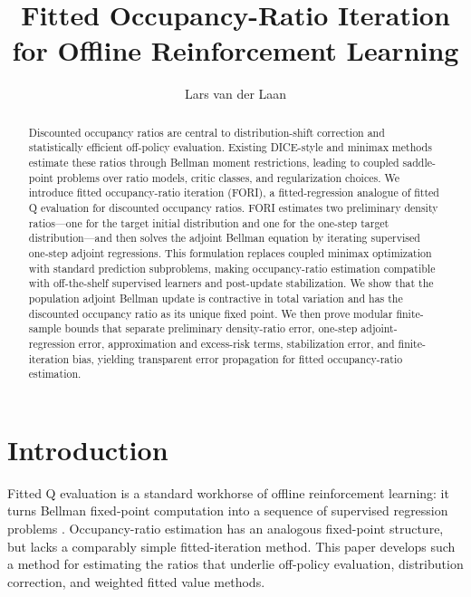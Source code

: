 \documentclass{article}
\title{Fitted Occupancy-Ratio Iteration for Offline Reinforcement Learning}
\author{Lars van der Laan}
\newcommand{\1}{\mathbf{1}}
\theoremstyle{plain}
\theoremstyle{definition}
\theoremstyle{remark}
\begin{document}
\maketitle
\begin{abstract}
Discounted occupancy ratios are central to distribution-shift correction and
statistically efficient off-policy evaluation. Existing DICE-style and minimax
methods estimate these ratios through Bellman moment restrictions, leading to
coupled saddle-point problems over ratio models, critic classes, and
regularization choices. We introduce fitted occupancy-ratio iteration
(\textsc{FORI}), a fitted-regression analogue of fitted Q evaluation for
discounted occupancy ratios. \textsc{FORI} estimates two preliminary density
ratios---one for the target initial distribution and one for the one-step target
distribution---and then solves the adjoint Bellman equation by iterating
supervised one-step adjoint regressions. This formulation replaces coupled
minimax optimization with standard prediction subproblems, making occupancy-ratio
estimation compatible with off-the-shelf supervised learners and post-update
stabilization. We show that the population adjoint Bellman update is
contractive in total variation and has the discounted occupancy ratio as its
unique fixed point. We then prove modular finite-sample bounds that separate
preliminary density-ratio error, one-step adjoint-regression error,
approximation and excess-risk terms, stabilization error, and finite-iteration
bias, yielding transparent error propagation for fitted occupancy-ratio
estimation.
\end{abstract}

\section{Introduction}

Fitted Q evaluation is a standard workhorse of offline reinforcement learning:
it turns Bellman fixed-point computation into a sequence of supervised
regression problems
\citep{lagoudakisParr2003LSPI,ernstEtAl2005TreeBatchRL,antosEtAl2007FQI,munosSzepesvari2008FVI,leEtAl2019BatchPolicyConstraints}.
Occupancy-ratio estimation has an analogous fixed-point structure, but lacks a
comparably simple fitted-iteration method. This paper develops such a method
for estimating the ratios that underlie off-policy evaluation, distribution
correction, and weighted fitted value methods.
\end{document}
